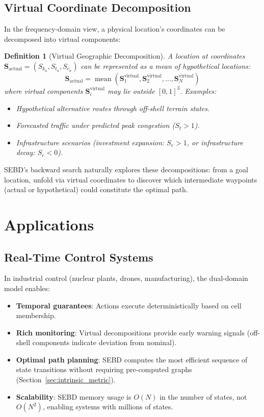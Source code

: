 \documentclass[twocolumn,11pt,a4paper]{article}
\newtheorem{definition}[theorem]{Definition}
\newcommand{\Sk}{S_k}
\newcommand{\St}{S_t}
\newcommand{\Se}{S_e}
\newcommand{\Stuple}{\mathbf{S}}
\DeclareMathOperator{\mean}{mean}
\begin{document}
\subsection{Virtual Coordinate Decomposition}

In the frequency-domain view, a physical location's coordinates can be decomposed into virtual components:

\begin{definition}[Virtual Geographic Decomposition]
A location at coordinates $\Stuple_{\text{actual}} = (\Sk_a, \St_a, \Se_a)$ can be represented as a mean of hypothetical locations:
\begin{equation}
\Stuple_{\text{actual}} = \mean(\Stuple_1^{\text{virtual}}, \Stuple_2^{\text{virtual}}, \ldots, \Stuple_N^{\text{virtual}})
\end{equation}
where virtual components $\Stuple_i^{\text{virtual}}$ may lie outside $[0,1]^3$. Examples:
\begin{itemize}[nosep]
  \item Hypothetical alternative routes through off-shell terrain states.
  \item Forecasted traffic under predicted peak congestion ($\St > 1$).
  \item Infrastructure scenarios (investment expansion: $\Se > 1$, or infrastructure decay: $\Se < 0$).
\end{itemize}
\end{definition}

SEBD's backward search naturally explores these decompositions: from a goal location, unfold via virtual coordinates to discover which intermediate waypoints (actual or hypothetical) could constitute the optimal path.

\section{Applications}
\label{sec:applications}

\subsection{Real-Time Control Systems}

In industrial control (nuclear plants, drones, manufacturing), the dual-domain model enables:
\begin{itemize}[nosep,leftmargin=1em]
  \item \textbf{Temporal guarantees}: Actions execute deterministically based on cell membership.
  \item \textbf{Rich monitoring}: Virtual decompositions provide early warning signals (off-shell components indicate deviation from nominal).
  \item \textbf{Optimal path planning}: SEBD computes the most efficient sequence of state transitions without requiring pre-computed graphs (Section~\ref{sec:intrinsic_metric}).
  \item \textbf{Scalability}: SEBD memory usage is $O(N)$ in the number of states, not $O(N^2)$, enabling systems with millions of states.
\end{itemize}
\end{document}
